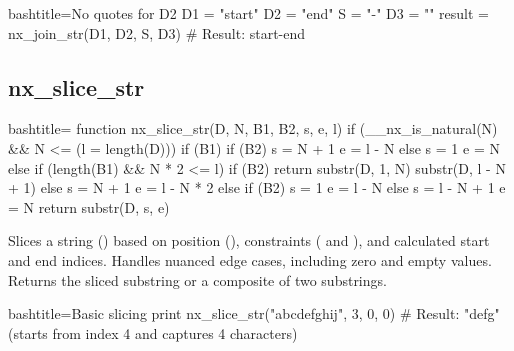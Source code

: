 \begin{NexCodeBox}{bash}{title={No quotes for D2}}
	D1 = "start"
	D2 = "end"
	S = "-"
	D3 = ""
	result = nx_join_str(D1, D2, S, D3)
	# Result: start-end
\end{NexCodeBox}

\newpage
\subsection{nx_slice_str}
\label{nx_slice_str}
\begin{NexCodeBox}{bash}{title={}}
function nx_slice_str(D, N, B1, B2, s, e, l) {
	if (__nx_is_natural(N) && N <= (l = length(D))) {
		if (B1) {
			if (B2) {
				s = N + 1
				e = l - N
			} else {
				s = 1
				e = N
			}
		} else if (length(B1) && N * 2 <= l) {
			if (B2) {
				return substr(D, 1, N) substr(D, l - N + 1)
			} else {
				s = N + 1
				e = l - N * 2
			}
		} else {
			if (B2) {
				s = 1
				e = l - N
			} else {
				s = l - N + 1
				e = N
			}
		}
		return substr(D, s, e)
	}
}
\end{NexCodeBox}

\begin{NexMainBox}
	\begin{NexMainBox}
		Slices a string () based on position (), constraints ( and ), and calculated start and end indices. Handles nuanced edge cases, including zero and empty values. Returns the sliced substring or a composite of two substrings.
	\end{NexMainBox}
	\begin{NexMainBox}
		\begin{NexListDark}
		\end{NexListDark}
	\end{NexMainBox}
\end{NexMainBox}

\begin{NexCodeBox}{bash}{title={Basic slicing}}
	print nx_slice_str("abcdefghij", 3, 0, 0)
	# Result: "defg" (starts from index 4 and captures 4 characters)
\end{NexCodeBox}

